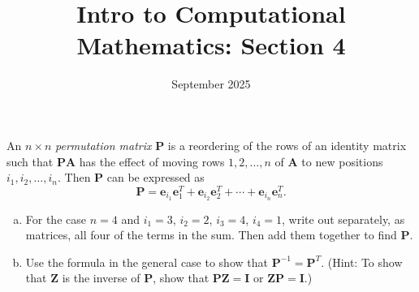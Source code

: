 \documentclass[11pt]{article}
\title{Intro to Computational Mathematics: Section 4}
\date{September 2025}
\renewcommand{\vec}[1]{\mathbf{#1}}
\newenvironment{problem}[2][Question]{\begin{trivlist}
\item[\hskip \labelsep {\bfseries #1}\hskip \labelsep {\bfseries #2.}]}{\end{trivlist}}
\theoremstyle{definition}
\begin{document}
\maketitle

\begin{problem}{2.6.4}
An $n \times n$ \textit{permutation matrix} $\vec{P}$ is a reordering of the rows of an identity matrix such that $\vec{P}\vec{A}$ has the effect of moving rows $1, 2, \ldots ,n$ of $\vec{A}$ to new positions $i_1, i_2, \ldots, i_n$. Then $\vec{P}$ can be expressed as $$\vec{P} = \vec{e}_{i_1}\vec{e}_{1}^T + \vec{e}_{i_2}\vec{e}_{2}^T + \cdots + \vec{e}_{i_n}\vec{e}_{n}^T.$$

\begin{enumerate}[(a)]
    \item For the case $n = 4$ and $i_1 = 3$, $i_2 = 2$, $i_3 = 4$, $i_4 = 1$, write out separately, as matrices, all four of the terms in the sum. Then add them together to find $\vec{P}$.

    \item Use the formula in the general case to show that $\vec{P}^{-1} = \vec{P}^T$. (Hint: To show that $\vec{Z}$ is the inverse of $\vec{P}$, show that $\vec{P}\vec{Z} = \vec{I}$ or $\vec{Z}\vec{P} = \vec{I}$.)
\end{enumerate}
\end{problem}
\end{document}
